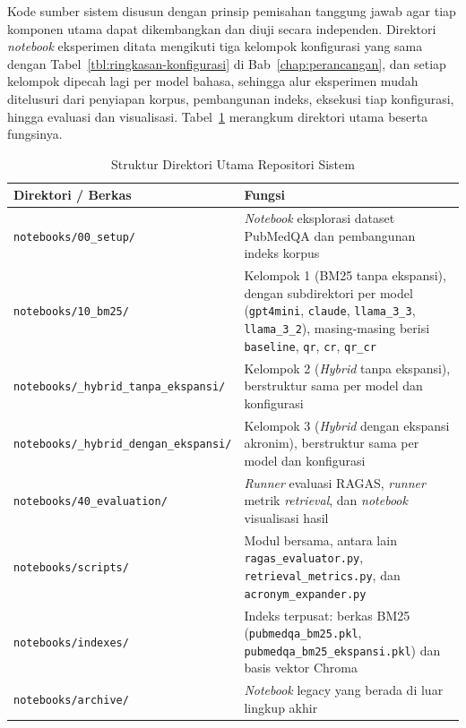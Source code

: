 Kode sumber sistem disusun dengan prinsip pemisahan tanggung jawab agar tiap komponen utama dapat dikembangkan dan diuji secara independen. Direktori \textit{notebook} eksperimen ditata mengikuti tiga kelompok konfigurasi yang sama dengan Tabel~\ref{tbl:ringkasan-konfigurasi} di Bab~\ref{chap:perancangan}, dan setiap kelompok dipecah lagi per model bahasa, sehingga alur eksperimen mudah ditelusuri dari penyiapan korpus, pembangunan indeks, eksekusi tiap konfigurasi, hingga evaluasi dan visualisasi. Tabel~\ref{tbl:struktur-repo} merangkum direktori utama beserta fungsinya.

\begin{table}[H]
\centering
\footnotesize
\setlength{\tabcolsep}{4pt}
\caption{Struktur Direktori Utama Repositori Sistem}
\label{tbl:struktur-repo}
\begin{tabular}{|>{\raggedright\arraybackslash}p{4.9cm}|p{8.4cm}|}
\hline
\textbf{Direktori / Berkas} & \textbf{Fungsi} \\ \hline
\texttt{notebooks/00\_setup/}                  & \textit{Notebook} eksplorasi dataset PubMedQA dan pembangunan indeks korpus \\ \hline
\texttt{notebooks/10\_bm25/}                   & Kelompok 1 (BM25 tanpa ekspansi), dengan subdirektori per model (\texttt{gpt4mini}, \texttt{claude}, \texttt{llama\_3\_3}, \texttt{llama\_3\_2}), masing-masing berisi \texttt{baseline}, \texttt{qr}, \texttt{cr}, \texttt{qr\_cr} \\ \hline
\texttt{notebooks/\allowbreak 20\_hybrid\_tanpa\_ekspansi/} & Kelompok 2 (\textit{Hybrid} tanpa ekspansi), berstruktur sama per model dan konfigurasi \\ \hline
\texttt{notebooks/\allowbreak 30\_hybrid\_dengan\_ekspansi/} & Kelompok 3 (\textit{Hybrid} dengan ekspansi akronim), berstruktur sama per model dan konfigurasi \\ \hline
\texttt{notebooks/40\_evaluation/}             & \textit{Runner} evaluasi RAGAS, \textit{runner} metrik \textit{retrieval}, dan \textit{notebook} visualisasi hasil \\ \hline
\texttt{notebooks/scripts/}                    & Modul bersama, antara lain \texttt{ragas\_evaluator.py}, \texttt{retrieval\_metrics.py}, dan \texttt{acronym\_expander.py} \\ \hline
\texttt{notebooks/indexes/}                    & Indeks terpusat: berkas BM25 (\texttt{pubmedqa\_bm25.pkl}, \texttt{pubmedqa\_bm25\_ekspansi.pkl}) dan basis vektor Chroma \\ \hline
\texttt{notebooks/archive/}                    & \textit{Notebook} legacy yang berada di luar lingkup akhir \\ \hline

\end{tabular}
\end{table}
